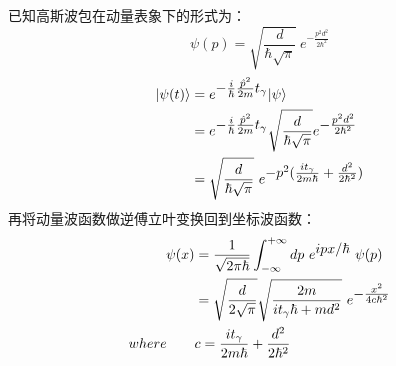 \documentclass{ctexart}
\newcommand{\ket}[1]{|#1\rangle}
\newcommand{\h}[1]{\hat{#1}}
\begin{document}
已知高斯波包在动量表象下的形式为：
\begin{equation}
    \psi(p) = \sqrt{\frac{d}{\hbar\sqrt{\pi}}}\ e^{\textstyle -\frac{p^2d^2}{2\hbar^2}}
\end{equation}
\begin{align}
    \ket{\psi(t)} &= e^{\textstyle -\frac{i}{\hbar} \frac{\h{p}^2}{2m} t_{\gamma}} \ket{\psi}  \notag\\
    &= e^{\textstyle -\frac{i}{\hbar} \frac{\h{p}^2}{2m} t_{\gamma}} \sqrt{\frac{d}{\hbar\sqrt{\pi}}}e^{\textstyle -\frac{p^2d^2}{2\hbar^2}} \notag\\
    &= \sqrt{\frac{d}{\hbar\sqrt{\pi}}}\ e^{\textstyle -p^2(\frac{it_{\gamma}}{2m\hbar} + \frac{d^2}{2\hbar^2})}
\end{align}
再将动量波函数做逆傅立叶变换回到坐标波函数：
\begin{align}
    \psi(x) &= \frac{1}{\sqrt{2\pi\hbar}}\int_{-\infty}^{+\infty}dp\ e^{\textstyle ipx/\hbar}\ \psi(p) \notag \\
    &= \sqrt{\frac{d}{2\sqrt{\pi}}} \sqrt{\frac{2m}{it_{\gamma}\hbar + md^2}}\ e^{\textstyle -\frac{x^2}{4c\hbar^2}} \\
    where \qquad & c = \frac{it_{\gamma}}{2m\hbar} + \frac{d^2}{2\hbar^2}
\end{align}
\end{document}
